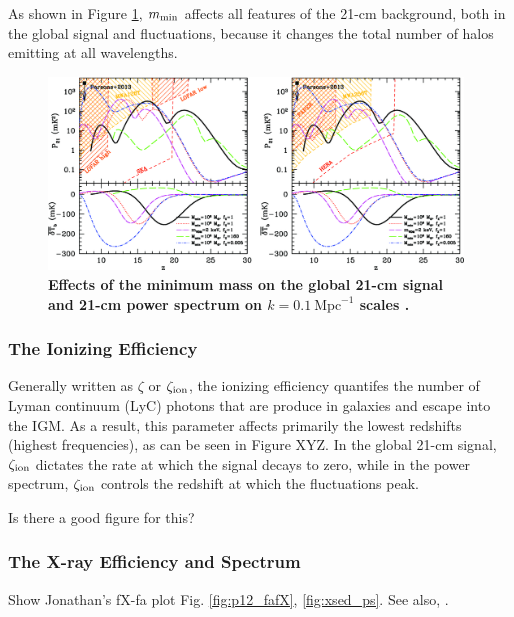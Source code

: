 As shown in Figure \ref{fig:mesinger2014_fig3}, $m_{\text{min}}$ affects all features of the 21-cm background, both in the global signal and fluctuations, because it changes the total number of halos emitting at all wavelengths.

 
\begin{figure}[]
\begin{center}
\includegraphics[width=0.98\textwidth]{Mirocha/mesinger2014_fig3.pdf}
\end{center}
\caption{{\bf Effects of the minimum mass on the global 21-cm signal and 21-cm power spectrum on $k=0.1 \ \mathrm{Mpc}^{-1}$ scales \cite{Mesinger2014}.}}
\label{fig:mesinger2014_fig3}
\end{figure}

\subsubsection{The Ionizing Efficiency}
Generally written as $\zeta$ or $\zeta_{\text{ion}}$, the ionizing efficiency quantifes the number of Lyman continuum (LyC) photons that are produce in galaxies and escape into the IGM. As a result, this parameter affects primarily the lowest redshifts (highest frequencies), as can be seen in Figure XYZ. In the global 21-cm signal, $\zeta_{\text{ion}}$ dictates the rate at which the signal decays to zero, while in the power spectrum, $\zeta_{\text{ion}}$ controls the redshift at which the fluctuations peak.

{\color{red} Is there a good figure for this?}

\subsubsection{The X-ray Efficiency and Spectrum}
Show Jonathan's fX-fa plot Fig. \ref{fig:p12_fafX}, \ref{fig:xsed_ps}. See also, \cite{Mirabel2011,Mirocha2014}.

